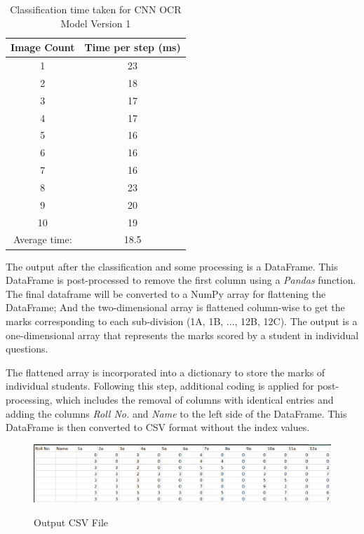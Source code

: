 \begin{table}[htbp]
    \centering
    \begin{tabular}{|c|c|}
        \hline
        Image Count & Time per step (ms) \\
        \hline
        1 & 23 \\
        2 & 18 \\
        3 & 17 \\
        4 & 17 \\
        5 & 16 \\
        6 & 16 \\
        7 & 16 \\
        8 & 23 \\
        9 & 20 \\
        10 & 19 \\
        \hline
        Average time: & 18.5 \\
        \hline
    \end{tabular}
    \caption{Classification time taken for CNN OCR Model Version 1}
\end{table}

\noindent The output after the classification and some processing is a DataFrame. This DataFrame is post-processed to remove the first column using a \textit{Pandas} function.\\

\noindent The final dataframe will be converted to a NumPy array for flattening the DataFrame; And the two-dimensional array is flattened column-wise to get the marks corresponding to each sub-division (1A, 1B, ..., 12B, 12C). The output is a one-dimensional array that represents the marks scored by a student in individual questions.

\clearpage

\noindent The flattened array is incorporated into a dictionary to store the marks of individual students. Following this step, additional coding is applied for post-processing, which includes the removal of columns with identical entries and adding the columns \textit{Roll No.} and \textit{Name} to the left side of the DataFrame. This DataFrame is then converted to CSV format without the index values.\\

\begin{figure}[h!]
    \centering
{\includegraphics[width=1\textwidth]{Images/prop_sys/csv_output.png}}
  \caption{Output CSV File}
\end{figure}

